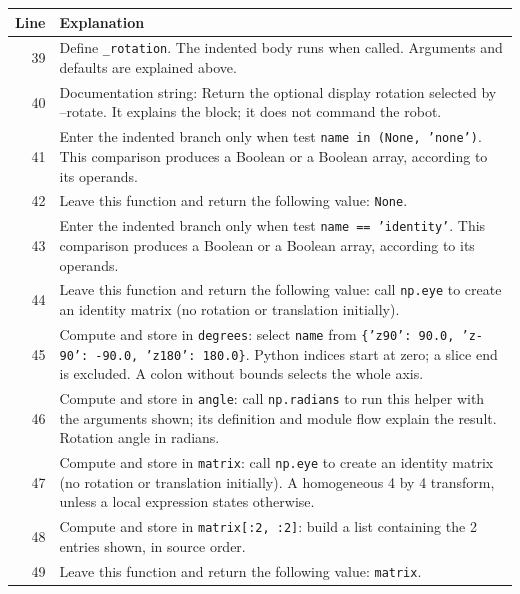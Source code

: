 \documentclass[11pt,a4paper]{book}
\begin{document}
\begin{longtable}{r p{}}

\textbf{Line} & \textbf{Explanation} \\ \hline \endhead

39 & Define \texttt{\_rotation}. The indented body runs when called. Arguments and defaults are explained above. \\

40 & Documentation string: Return the optional display rotation selected by --rotate. It explains the block; it does not command the robot. \\

41 & Enter the indented branch only when test \texttt{name in (None, 'none')}. This comparison produces a Boolean or a Boolean array, according to its operands. \\

42 & Leave this function and return the following value: \texttt{None}. \\

43 & Enter the indented branch only when test \texttt{name == 'identity'}. This comparison produces a Boolean or a Boolean array, according to its operands. \\

44 & Leave this function and return the following value: call \texttt{np.eye} to create an identity matrix (no rotation or translation initially). \\

45 & Compute and store in \texttt{degrees}: select \texttt{name} from \texttt{\{'z90': 90.0, 'z-90': -90.0, 'z180': 180.0\}}. Python indices start at zero; a slice end is excluded. A colon without bounds selects the whole axis.  \\

46 & Compute and store in \texttt{angle}: call \texttt{np.radians} to run this helper with the arguments shown; its definition and module flow explain the result. Rotation angle in radians. \\

47 & Compute and store in \texttt{matrix}: call \texttt{np.eye} to create an identity matrix (no rotation or translation initially). A homogeneous 4 by 4 transform, unless a local expression states otherwise. \\

48 & Compute and store in \texttt{matrix[:2, :2]}: build a list containing the 2 entries shown, in source order.  \\

49 & Leave this function and return the following value: \texttt{matrix}. \\

\end{longtable}
\end{document}
